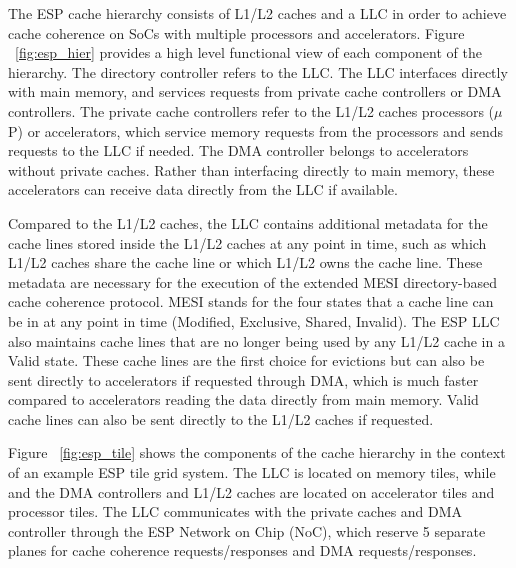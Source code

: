 \documentclass{sig-alternate}
\begin{document}
The ESP cache hierarchy consists of L1/L2 caches and a LLC in order to achieve cache coherence on SoCs with multiple processors and accelerators. Figure ~\ref{fig:esp_hier} provides a high level functional view of each component of the hierarchy.
The directory controller refers to the LLC. The LLC interfaces directly with main memory, and services requests from private cache controllers or DMA controllers. 
The private cache controllers refer to the L1/L2 caches processors ($\mu$P) or accelerators, 
which service memory requests from the processors and sends requests to the LLC if needed. The DMA controller belongs to accelerators
without private caches. Rather than interfacing directly to main memory, these accelerators can receive data directly from the LLC if available.
\par Compared to the L1/L2 caches, the LLC contains additional metadata for the cache lines stored inside the L1/L2 caches at any point in time, such as which L1/L2 caches share the cache line or which L1/L2 owns the cache line. 
These metadata are necessary for the execution of the extended MESI directory-based cache coherence protocol. MESI stands for the four states that a cache line can be in at any point in time (Modified, Exclusive, Shared, Invalid).
The ESP LLC also maintains cache lines that are no longer being used by any L1/L2 cache in a Valid state. These cache lines are the first choice for evictions but can also be sent directly to accelerators if requested through DMA, which is 
much faster compared to accelerators reading the data directly from main memory. Valid cache lines can also be sent directly to the L1/L2 caches if requested.
\par Figure ~\ref{fig:esp_tile} shows the components of the cache hierarchy in the context of an example ESP tile grid system. The LLC is located on memory tiles, while and the DMA controllers and L1/L2 caches are located on 
accelerator tiles and processor tiles. The LLC communicates with the private caches and DMA controller through the ESP Network on Chip (NoC), which reserve 5 separate planes 
for cache coherence requests/responses and DMA requests/responses.
\end{document}
